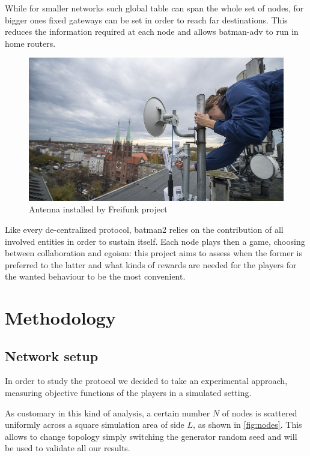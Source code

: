 \documentclass[conference,10.5pt]{IEEEtran}
\begin{document}
While for smaller networks such global table can span the whole set of nodes, for bigger ones fixed gateways can be set in order to reach far destinations. This reduces the information required at each node and allows \gls{batman}-adv to run in home routers.

\begin{figure}[h]
  \centering
  \includegraphics[width=0.8\linewidth]{figures/batman_antenna}
  \caption{Antenna installed by Freifunk project}
  \label{fig:freifunk_img}
\end{figure}

\smallskip

Like every de-centralized protocol, \gls{batman2} relies on the contribution of all involved entities in order to sustain itself. Each node plays then a game, choosing between collaboration and egoism: this project aims to assess when the former is preferred to the latter and what kinds of rewards are needed for the players for the wanted behaviour to be the most convenient.

\section{Methodology}

\subsection{Network setup}

In order to study the protocol we decided to take an experimental approach, measuring objective functions of the players in a simulated setting.

As customary in this kind of analysis, a certain number $N$ of nodes is scattered uniformly across a square simulation area of side $L$, as shown in \autoref{fig:nodes}. This allows to change topology simply switching the generator random seed and will be used to validate all our results.
\end{document}
